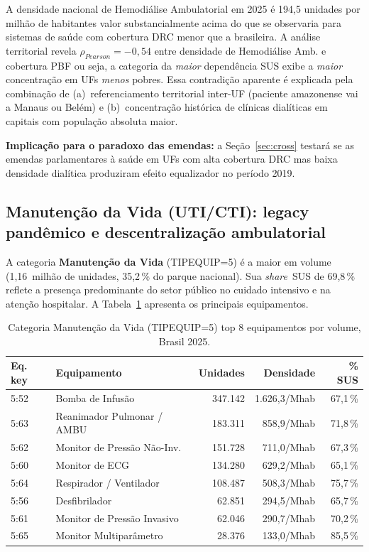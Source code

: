 \documentclass[12pt,a4paper,oneside]{article}
\begin{document}
A densidade nacional de Hemodiálise Ambulatorial em 2025 é
194,5 unidades por milhão de habitantes \textemdash{} valor
substancialmente acima do que se observaria para sistemas de
saúde com cobertura DRC menor que a brasileira. A análise
territorial revela $\rho_{Pearson} = -0{,}54$ entre densidade de
Hemodiálise Amb. e cobertura PBF \textemdash{} ou seja, a categoria
da \textit{maior} dependência SUS exibe a \textit{maior} concentração
em UFs \textit{menos} pobres. Essa contradição aparente é explicada
pela combinação de (a)~referenciamento territorial inter-UF (paciente
amazonense vai a Manaus ou Belém) e (b)~concentração histórica de
clínicas dialíticas em capitais com população absoluta maior.

\textbf{Implicação para o paradoxo das emendas:} a Seção~\ref{sec:cross}
testará se as emendas parlamentares à saúde em UFs com alta cobertura
DRC mas baixa densidade dialítica produziram efeito equalizador no
período 2019.

\subsection{Manutenção da Vida (UTI/CTI): legacy pandêmico e
descentralização ambulatorial}\label{sub:manutencao}

A categoria \textbf{Manutenção da Vida} (TIPEQUIP=5) é a maior em
volume (1,16~milhão de unidades, 35,2\,\% do parque nacional). Sua
\textit{share}~SUS de 69,8\,\% reflete a presença predominante do
setor público no cuidado intensivo e na atenção hospitalar. A
Tabela~\ref{tab:uti-detalhe} apresenta os principais equipamentos.

\begin{table}[htbp]
\centering
\caption{Categoria Manutenção da Vida (TIPEQUIP=5) \textemdash{}
top 8 equipamentos por volume, Brasil 2025.}
\label{tab:uti-detalhe}
\small
\begin{tabular}{l l r r r}
\toprule
\textbf{Eq. key} & \textbf{Equipamento} & \textbf{Unidades} &
\textbf{Densidade} & \textbf{\% SUS} \\
\midrule
5{:}52 & Bomba de Infusão              & 347.142 & 1.626,3/Mhab & 67,1\,\% \\
5{:}63 & Reanimador Pulmonar / AMBU    & 183.311 &   858,9/Mhab & 71,8\,\% \\
5{:}62 & Monitor de Pressão Não-Inv.   & 151.728 &   711,0/Mhab & 67,3\,\% \\
5{:}60 & Monitor de ECG                & 134.280 &   629,2/Mhab & 65,1\,\% \\
5{:}64 & Respirador / Ventilador       & 108.487 &   508,3/Mhab & 75,7\,\% \\
5{:}56 & Desfibrilador                 &  62.851 &   294,5/Mhab & 65,7\,\% \\
5{:}61 & Monitor de Pressão Invasivo   &  62.046 &   290,7/Mhab & 70,2\,\% \\
5{:}65 & Monitor Multiparâmetro        &  28.376 &   133,0/Mhab & 85,5\,\% \\
\bottomrule
\end{tabular}
\end{table}
\end{document}
